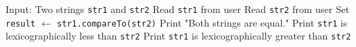 \begin{algorithm}[H]
\caption{Compare Two Strings Lexicographically}
\begin{algorithmic}[1]
\STATE Input: Two strings \texttt{str1} and \texttt{str2}
\STATE Read \texttt{str1} from user
\STATE Read \texttt{str2} from user
\STATE Set \texttt{result} $\gets$ \texttt{str1.compareTo(str2)}
    \STATE Print "Both strings are equal."
    \STATE Print \texttt{str1} is lexicographically less than \texttt{str2}
\ELSE
    \STATE Print \texttt{str1} is lexicographically greater than \texttt{str2}
\ENDIF
\end{algorithmic}
\end{algorithm}